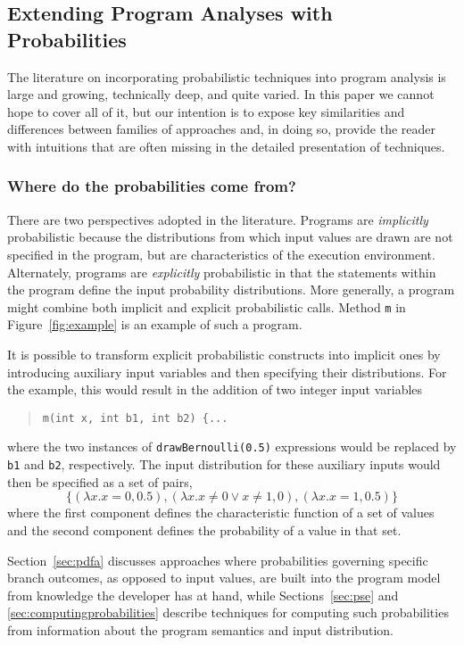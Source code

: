 \subsection{Extending Program Analyses with Probabilities}
\label{sec:overview}

The literature on incorporating probabilistic techniques into 
program analysis is large and growing, technically deep, and quite
varied.  In this paper we cannot hope to cover all of it, but our
intention is to expose key similarities and differences between 
families of approaches and, in doing so, provide the reader with
intuitions that are often missing in the detailed presentation of
techniques.

\subsubsection{Where do the probabilities come from?}
There are two perspectives adopted in the literature.
Programs are \textit{implicitly} probabilistic because the distributions
from which input values are drawn are not specified in the program,
but are characteristics of the execution environment.
Alternately, programs are \textit{explicitly} probabilistic in 
that the statements
within the program define the input probability distributions.
More generally, a program might combine both implicit and explicit
probabilistic calls.  Method \texttt{m} in Figure~\ref{fig:example}
is an example of such a program.

It is possible to transform explicit probabilistic constructs
into implicit ones
by introducing auxiliary input variables and then specifying
their distributions.   For the example, this would result
in the addition of two integer input variables 
\begin{quote}
\texttt{m(int x, int b1, int b2) \{...} 
\end{quote}
where the two instances of
\texttt{drawBernoulli(0.5)} expressions would be replaced
by \texttt{b1} and \texttt{b2}, respectively.  The input
distribution for these auxiliary inputs would then be specified
as a set of pairs,
\[
\{ (\lambda x.x=0,0.5), (\lambda x.x\not=0 \vee x\not=1, 0), (\lambda x.x=1,0.5)\}
\]
where the first component defines the characteristic function
of a set of values and the second component defines the probability
of a value in that set.

Section~\ref{sec:pdfa} discusses approaches where probabilities
governing specific branch outcomes, as opposed to input values,
are built into the program model from knowledge the developer
has at hand, while Sections~\ref{sec:pse} and \ref{sec:computingprobabilities}
describe techniques for computing such probabilities from information about
the program semantics and input distribution.

